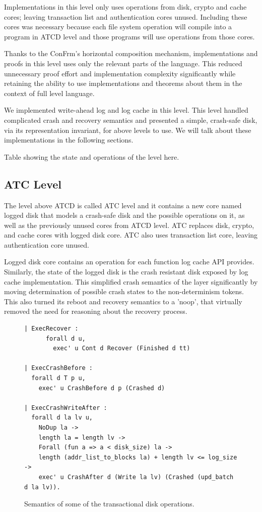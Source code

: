 Implementations in this level only uses operations from disk, crypto and cache cores; leaving transaction list and authentication cores unused. Including these cores was necessary because each file system operation will compile into a program in ATCD level and those programs will use operations from those cores. 

Thanks to the ConFrm's horizontal composition mechanism, implementations and proofs in this level uses only the relevant parts of the language. This reduced unnecessary proof effort and implementation complexity significantly while retaining the ability to use implementations and theorems about them in the context of full level language.

We implemented write-ahead log and log cache in this level. This level handled complicated crash and recovery semantics and presented a simple, crash-safe disk, via its representation invariant, for above levels to use. We will talk about these implementations in the following sections.


{\color{red} Table showing the state and operations of the level here}.

\subsection{ATC Level}
The level above ATCD is called ATC level and it contains a new core named logged disk that models a crash-safe disk and the possible operations on it, as well as the previously unused cores from ATCD level. ATC replaces disk, crypto, and cache cores with logged disk core. ATC also uses transaction list core, leaving authentication core unused.

Logged disk core contains an operation for each function log cache API provides. Similarly, the state of the logged disk is the crash resistant disk exposed by log cache implementation. This simplified crash semantics of the layer significantly by moving determination of possible crash states to the non-determinism tokens. This also turned its reboot and recovery semantics to a 'noop', that virtually removed the need for reasoning about the recovery process. 

\begin{figure}[ht]
    \centering
\begin{verbatim}
| ExecRecover : 
      forall d u,
        exec' u Cont d Recover (Finished d tt)
        
| ExecCrashBefore :
  forall d T p u,
    exec' u CrashBefore d p (Crashed d)

| ExecCrashWriteAfter :
  forall d la lv u,
    NoDup la ->
    length la = length lv ->
    Forall (fun a => a < disk_size) la ->
    length (addr_list_to_blocks la) + length lv <= log_size ->
    exec' u CrashAfter d (Write la lv) (Crashed (upd_batch d la lv)).
\end{verbatim}
    \caption{Semantics of some of the transactional disk operations.}
    \label{fig:LD_Crash_Semantics}
\end{figure}

